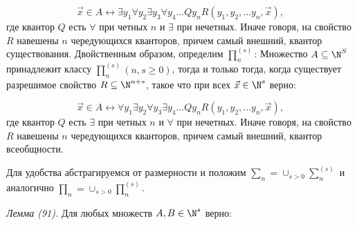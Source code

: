 \documentclass[a4paper, 10pt]{article}
\begin{document}
$$ \vec{x} \in A \leftrightarrow \exists y_1 \forall y_2 \exists y_3 \forall y_4 \ldots Q y_n R(y_1, y_2, \ldots y_n, \vec{x}),$$
где квантор $Q$ есть $\forall$ при четных $n$ и $\exists$ при нечетных. Иначе говоря, на свойство $R$ навешены $n$ чередующихся кванторов, причем самый внешний, квантор существования.
Двойственным образом, определим $\prod_n^{(s)}$: Множество $A \subseteq \N^S$ принадлежит классу $\prod_n^{(s)} (n,s \geq 0)$, тогда и только тогда, когда существует разрешимое свойство $R \subseteq \N^{n+s}$, такое что при всех $\vec{x} \in \N^{s}$ верно:

$$ \vec{x} \in A \leftrightarrow \forall y_1 \exists y_2 \forall y_3 \exists y_4 \ldots Q y_n R(y_1, y_2, \ldots y_n, \vec{x}),$$
где квантор $Q$ есть $\exists$ при четных $n$ и $\forall$ при нечетных. Иначе говоря, на свойство $R$ навешены $n$ чередующихся кванторов, причем самый внешний, квантор всеобщности. 

Для удобства абстрагируемся от размерности и положим $\sum_n = \cup_{s > 0} \sum_n^{(s)}$ и аналогично $\prod_n = \cup_{s > 0} \prod_n^{(s)}$.

\textit{Лемма (91).} Для любых множеств $A, B \in \N^{s}$ верно:
\end{document}
